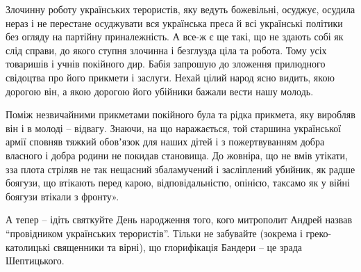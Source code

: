 Злочинну роботу українських терористів, яку ведуть божевільні, осуджує, осудила
нераз і не перестане осуджувати вся українська преса й всі українські політики
без огляду на партійну приналежність. А все-ж є ще такі, що не здають собі як
слід справи, до якого ступня злочинна і безглузда ціла та робота. Тому усіх
товаришів і учнів покійного дир. Бабія запрошую до зложення прилюдного
свідоцтва про його прикмети і заслуги. Нехай цілий народ ясно видить, якою
дорогою він, а якою дорогою його убійники бажали вести нашу молодь.

Поміж незвичайними прикметами покійного була та рідка прикмета, яку виробляв
він і в молоді – відвагу. Знаючи, на що наражається, той старшина української
армії сповняв тяжкий обовʼязок для наших дітей і з пожертвуванням добра
власного і добра родини не покидав становища. До жовніра, що не вмів утікати,
зза плота стріляв не так нещасний збаламучений і засліплений убийник, як радше
боягузи, що втікають перед карою, відповідальністю, опінією, таксамо як у війні
боягузи втікали з фронту».

А тепер – ідіть святкуйте День народження того, кого митрополит Андрей назвав
\enquote{провідником українських терористів}. Тільки не забувайте (зокрема і
греко-католицькі священники та вірні), що глорифікація Бандери – це зрада
Шептицького.

